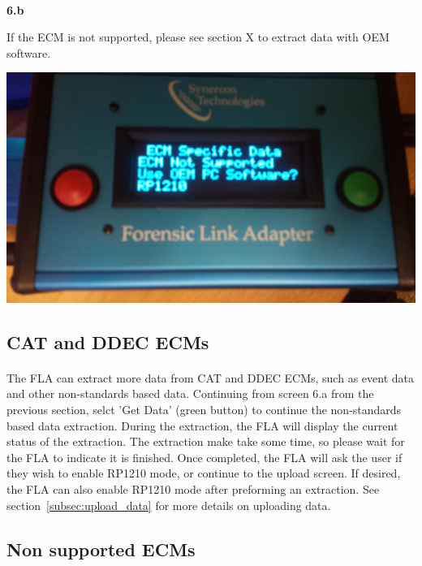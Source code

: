 \documentclass[11pt]{article}
\begin{document}
\\[\baselineskip]
\noindent\begin{minipage}{0.3\textwidth}%
\begin{center}
\textbf{6.b}\\[\baselineskip]
\end{center}
If the ECM is not supported, please see section X to extract data with OEM software.
\end{minipage}%
\hfill%
\begin{minipage}{0.6\textwidth}
\includegraphics[width=\linewidth]{./fla_screens/ecm_not_supported}
\end{minipage}

\subsection{CAT and DDEC ECMs}
\paragraph{  }
The FLA can extract more data from CAT and DDEC ECMs, such as event data and other non-standards based data. Continuing from screen 6.a from the previous section, selct 'Get Data' (green button) to continue the non-standards based data extraction. During the extraction, the FLA will display the current status of the extraction. The extraction make take some time, so please wait for the FLA to indicate it is finished. Once completed, the FLA will ask the user if they wish to enable RP1210 mode, or continue to the upload screen. If desired, the FLA can also enable RP1210 mode after preforming an extraction. See section~\ref{subsec:upload_data} for more details on uploading data.

\subsection{Non supported ECMs}
\end{document}

